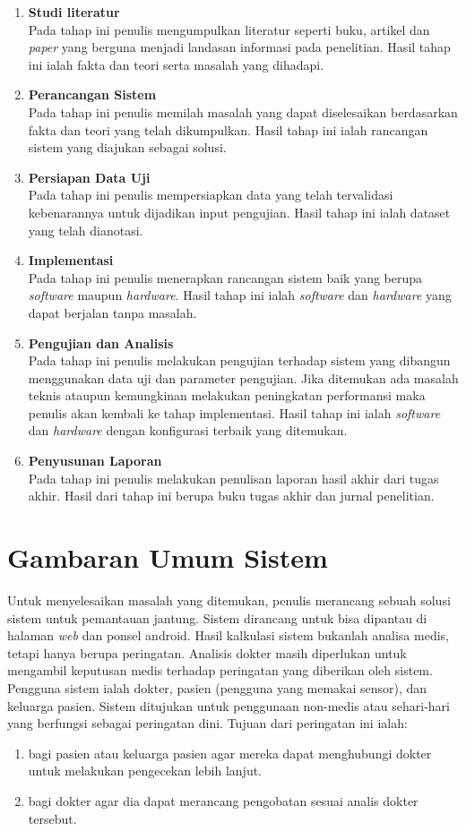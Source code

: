 \begin{enumerate}
	\item \textbf{Studi literatur} \\
	Pada tahap ini penulis mengumpulkan literatur seperti buku, artikel dan \textit{paper} yang berguna menjadi landasan informasi pada penelitian. Hasil tahap ini ialah fakta dan teori serta masalah yang dihadapi.
	\item \textbf{Perancangan Sistem} \\
	Pada tahap ini penulis memilah masalah yang dapat diselesaikan berdasarkan fakta dan teori yang telah dikumpulkan. Hasil tahap ini ialah rancangan sistem yang diajukan sebagai solusi.
	\item \textbf{Persiapan Data Uji} \\
	Pada tahap ini penulis mempersiapkan data yang telah tervalidasi kebenarannya untuk dijadikan input pengujian. Hasil tahap ini ialah dataset yang telah dianotasi.
	\item \textbf{Implementasi} \\
	Pada tahap ini penulis menerapkan rancangan sistem baik yang berupa \textit{software} maupun \textit{hardware}. Hasil tahap ini ialah \textit{software} dan \textit{hardware} yang dapat berjalan tanpa masalah.
	\item \textbf{Pengujian dan Analisis} \\
	Pada tahap ini penulis melakukan pengujian terhadap sistem yang dibangun menggunakan data uji dan parameter pengujian. Jika ditemukan ada masalah teknis ataupun kemungkinan melakukan peningkatan performansi maka penulis akan kembali ke tahap implementasi. Hasil tahap ini ialah \textit{software} dan \textit{hardware} dengan konfigurasi terbaik yang ditemukan.
	\item \textbf{Penyusunan Laporan} \\
	Pada tahap ini penulis melakukan penulisan laporan hasil akhir dari tugas akhir. Hasil dari tahap ini berupa buku tugas akhir dan jurnal penelitian.
\end{enumerate}

\section{Gambaran Umum Sistem}
Untuk menyelesaikan masalah yang ditemukan, penulis merancang sebuah solusi sistem untuk pemantauan jantung. Sistem dirancang untuk bisa dipantau di halaman \textit{web} dan ponsel android. Hasil kalkulasi sistem bukanlah analisa medis, tetapi hanya berupa peringatan. Analisis dokter masih diperlukan untuk mengambil keputusan medis terhadap peringatan yang diberikan oleh sistem. Pengguna sistem ialah dokter, pasien (pengguna yang memakai sensor), dan keluarga pasien. Sistem ditujukan untuk penggunaan non-medis atau sehari-hari yang berfungsi sebagai peringatan dini. Tujuan dari peringatan ini ialah:
\begin{enumerate}
	\item bagi pasien atau keluarga pasien agar mereka dapat menghubungi dokter untuk melakukan pengecekan lebih lanjut.
	\item bagi dokter agar dia dapat merancang pengobatan sesuai analis dokter tersebut.
\end{enumerate}

